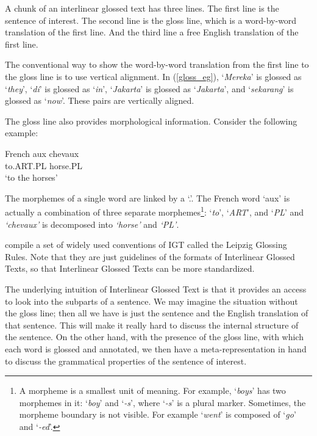 \documentclass[final]{ua-thesis}
\numberwithin{equation}{section}
\begin{document}
A chunk of an interlinear glossed text has three lines. The first line is the sentence of interest. The second line is the gloss line, which is a word-by-word translation of the first line. And the third line a free English translation of the first line.

The conventional way to show the word-by-word translation from the first line to the gloss line is to use vertical alignment. In (\ref{gloss_eg}), `\textit{Mereka}' is glossed as `\textit{they}', `\textit{di}' is glossed as `\textit{in}', `\textit{Jakarta}' is glossed as `\textit{Jakarta}', and `\textit{sekarang}' is glossed as `\textit{now}'. These pairs are vertically aligned. 

The gloss line also provides morphological information. Consider the following example:

\begin{exe}  
\ex French
	\gll   aux chevaux\\
     	   to.ART.PL horse.PL \\
    \glt   `to the horses'  
\end{exe}

The morphemes of a single word are linked by a `.'. The French word `aux' is actually a combination of three separate morphemes\footnote{A morpheme is a smallest unit of meaning. For example, `\textit{boys}' has two morphemes in it: `\textit{boy}' and `\textit{-s}', where `\textit{-s}' is a plural marker. Sometimes, the morpheme boundary is not visible. For example `\textit{went}' is composed of `\textit{go}' and `\textit{-ed}'.}: `\textit{to}', `\textit{ART}', and `\textit{PL}' and \textit{`chevaux'} is decomposed into \textit{`horse'} and \textit{`PL'}.

\citet{bickel2008leipzig} compile a set of widely used conventions of IGT called the Leipzig Glossing Rules.
Note that they are just guidelines of the formats of Interlinear Glossed Texts, so that Interlinear Glossed Texts can be more standardized. 

The underlying intuition of Interlinear Glossed Text is that it provides an access to look into the subparts of a sentence. We may imagine the situation without the gloss line; then all we have is just the sentence and the English translation of that sentence. This will make it really hard to discuss the internal structure of the sentence. On the other hand, with the presence of the gloss line, with which each word is glossed and annotated, we then have a meta-representation in hand to discuss the grammatical properties of the sentence of interest.  
 
\end{document}
